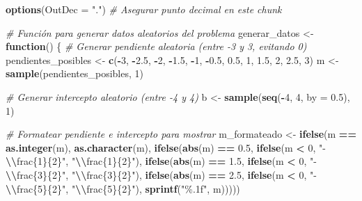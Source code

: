 \documentclass[
]{article}
\author{}
\date{\vspace{-2.5em}}
\newenvironment{Shaded}{\begin{snugshade}}{\end{snugshade}}
\newcommand{\AttributeTok}[1]{\textcolor[rgb]{0.13,0.29,0.53}{#1}}
\newcommand{\CommentTok}[1]{\textcolor[rgb]{0.56,0.35,0.01}{\textit{#1}}}
\newcommand{\ControlFlowTok}[1]{\textcolor[rgb]{0.13,0.29,0.53}{\textbf{#1}}}
\newcommand{\DecValTok}[1]{\textcolor[rgb]{0.00,0.00,0.81}{#1}}
\newcommand{\FloatTok}[1]{\textcolor[rgb]{0.00,0.00,0.81}{#1}}
\newcommand{\FunctionTok}[1]{\textcolor[rgb]{0.13,0.29,0.53}{\textbf{#1}}}
\newcommand{\NormalTok}[1]{#1}
\newcommand{\OtherTok}[1]{\textcolor[rgb]{0.56,0.35,0.01}{#1}}
\newcommand{\SpecialCharTok}[1]{\textcolor[rgb]{0.81,0.36,0.00}{\textbf{#1}}}
\newcommand{\StringTok}[1]{\textcolor[rgb]{0.31,0.60,0.02}{#1}}
\begin{document}
\begin{Shaded}
\begin{Highlighting}[]
\FunctionTok{options}\NormalTok{(}\AttributeTok{OutDec =} \StringTok{"."}\NormalTok{)  }\CommentTok{\# Asegurar punto decimal en este chunk}

\CommentTok{\# Función para generar datos aleatorios del problema}
\NormalTok{generar\_datos }\OtherTok{\textless{}{-}} \ControlFlowTok{function}\NormalTok{() \{}
  \CommentTok{\# Generar pendiente aleatoria (entre {-}3 y 3, evitando 0)}
\NormalTok{  pendientes\_posibles }\OtherTok{\textless{}{-}} \FunctionTok{c}\NormalTok{(}\SpecialCharTok{{-}}\DecValTok{3}\NormalTok{, }\SpecialCharTok{{-}}\FloatTok{2.5}\NormalTok{, }\SpecialCharTok{{-}}\DecValTok{2}\NormalTok{, }\SpecialCharTok{{-}}\FloatTok{1.5}\NormalTok{, }\SpecialCharTok{{-}}\DecValTok{1}\NormalTok{, }\SpecialCharTok{{-}}\FloatTok{0.5}\NormalTok{, }\FloatTok{0.5}\NormalTok{, }\DecValTok{1}\NormalTok{, }\FloatTok{1.5}\NormalTok{, }\DecValTok{2}\NormalTok{, }\FloatTok{2.5}\NormalTok{, }\DecValTok{3}\NormalTok{)}
\NormalTok{  m }\OtherTok{\textless{}{-}} \FunctionTok{sample}\NormalTok{(pendientes\_posibles, }\DecValTok{1}\NormalTok{)}
  
  \CommentTok{\# Generar intercepto aleatorio (entre {-}4 y 4)}
\NormalTok{  b }\OtherTok{\textless{}{-}} \FunctionTok{sample}\NormalTok{(}\FunctionTok{seq}\NormalTok{(}\SpecialCharTok{{-}}\DecValTok{4}\NormalTok{, }\DecValTok{4}\NormalTok{, }\AttributeTok{by =} \FloatTok{0.5}\NormalTok{), }\DecValTok{1}\NormalTok{)}
  
  \CommentTok{\# Formatear pendiente e intercepto para mostrar}
\NormalTok{  m\_formateado }\OtherTok{\textless{}{-}} \FunctionTok{ifelse}\NormalTok{(m }\SpecialCharTok{==} \FunctionTok{as.integer}\NormalTok{(m), }\FunctionTok{as.character}\NormalTok{(m), }
                        \FunctionTok{ifelse}\NormalTok{(}\FunctionTok{abs}\NormalTok{(m) }\SpecialCharTok{==} \FloatTok{0.5}\NormalTok{, }\FunctionTok{ifelse}\NormalTok{(m }\SpecialCharTok{\textless{}} \DecValTok{0}\NormalTok{, }\StringTok{"{-}}\SpecialCharTok{\textbackslash{}\textbackslash{}}\StringTok{frac\{1\}\{2\}"}\NormalTok{, }\StringTok{"}\SpecialCharTok{\textbackslash{}\textbackslash{}}\StringTok{frac\{1\}\{2\}"}\NormalTok{),}
                               \FunctionTok{ifelse}\NormalTok{(}\FunctionTok{abs}\NormalTok{(m) }\SpecialCharTok{==} \FloatTok{1.5}\NormalTok{, }\FunctionTok{ifelse}\NormalTok{(m }\SpecialCharTok{\textless{}} \DecValTok{0}\NormalTok{, }\StringTok{"{-}}\SpecialCharTok{\textbackslash{}\textbackslash{}}\StringTok{frac\{3\}\{2\}"}\NormalTok{, }\StringTok{"}\SpecialCharTok{\textbackslash{}\textbackslash{}}\StringTok{frac\{3\}\{2\}"}\NormalTok{),}
                                      \FunctionTok{ifelse}\NormalTok{(}\FunctionTok{abs}\NormalTok{(m) }\SpecialCharTok{==} \FloatTok{2.5}\NormalTok{, }\FunctionTok{ifelse}\NormalTok{(m }\SpecialCharTok{\textless{}} \DecValTok{0}\NormalTok{, }\StringTok{"{-}}\SpecialCharTok{\textbackslash{}\textbackslash{}}\StringTok{frac\{5\}\{2\}"}\NormalTok{, }\StringTok{"}\SpecialCharTok{\textbackslash{}\textbackslash{}}\StringTok{frac\{5\}\{2\}"}\NormalTok{),}
                                             \FunctionTok{sprintf}\NormalTok{(}\StringTok{"\%.1f"}\NormalTok{, m)))))}
  

\end{Highlighting}
\end{Shaded}
\end{document}
